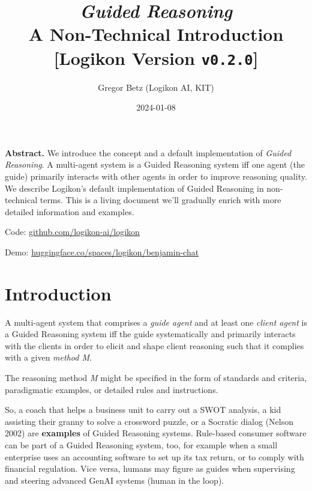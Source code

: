 \documentclass[
  letterpaper,
  DIV=11,
  numbers=noendperiod]{scrartcl}
\title{\emph{Guided Reasoning}\\
A Non-Technical Introduction\\
{[}Logikon Version \texttt{v0.2.0}{]}}
\author{Gregor Betz (Logikon AI, KIT)}
\date{2024-01-08}
\providecommand{\tightlist}{%
  \setlength{\itemsep}{0pt}\setlength{\parskip}{0pt}}\usepackage{longtable,booktabs,array}
\begin{document}
\maketitle
\ifdefined\Shaded\renewenvironment{Shaded}{\begin{tcolorbox}[enhanced, boxrule=0pt, frame hidden, breakable, interior hidden, sharp corners, borderline west={3pt}{0pt}{shadecolor}]}{\end{tcolorbox}}\fi

\textbf{Abstract.} We introduce the concept and a default implementation
of \emph{Guided Reasoning}. A multi-agent system is a Guided Reasoning
system iff one agent (the guide) primarily interacts with other agents
in order to improve reasoning quality. We describe Logikon's default
implementation of Guided Reasoning in non-technical terms. This is a
living document we'll gradually enrich with more detailed information
and examples.

Code:
\href{https://github.com/logikon-ai/logikon}{github.com/logikon-ai/logikon}

Demo:
\href{https://huggingface.co/spaces/logikon/benjamin-chat}{huggingface.co/spaces/logikon/benjamin-chat}

\hypertarget{introduction}{%
\section{Introduction}\label{introduction}}

\begin{description}
\tightlist
\item[Definition Guided Reasoning (general).]
A multi-agent system that comprises a \emph{guide agent} and at least
one \emph{client agent} is a Guided Reasoning system iff the guide
systematically and primarily interacts with the clients in order to
elicit and shape client reasoning such that it complies with a given
\emph{method M}.
\end{description}

The reasoning method \emph{M} might be specified in the form of
standards and criteria, paradigmatic examples, or detailed rules and
instructions.

So, a coach that helps a business unit to carry out a SWOT analysis, a
kid assisting their granny to solve a crossword puzzle, or a Socratic
dialog (Nelson 2002) are \textbf{examples} of Guided Reasoning systems.
Rule-based consumer software can be part of a Guided Reasoning system,
too, for example when a small enterprise uses an accounting software to
set up its tax return, or to comply with financial regulation. Vice
versa, humans may figure as guides when supervising and steering
advanced GenAI systems (human in the loop).
\end{document}
